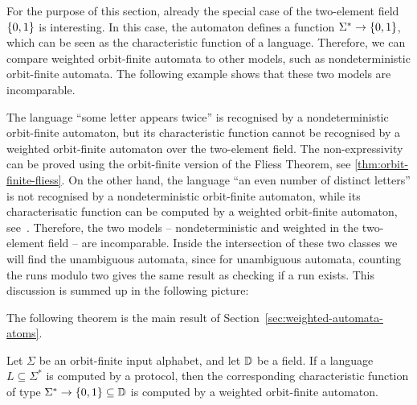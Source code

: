 For the purpose of this section, already the special case of the two-element field $\{0,1\}$ is interesting. In this case, the automaton defines a function $\Sigma^* \to \{0,1\}$, which can be seen as the characteristic function of a language. Therefore, we can compare weighted orbit-finite automata to other models, such as nondeterministic orbit-finite automata. The following example shows that these two  models are incomparable. 

\begin{myexample}\label{ex:weighted-vs-nondet-orbit-finite}
    The language ``some letter appears twice'' is recognised by a nondeterministic orbit-finite automaton, but its characteristic function cannot be  recognised by a weighted orbit-finite automaton over the two-element field. The non-expressivity can be proved using the orbit-finite version of the Fliess Theorem, see \cref{thm:orbit-finite-fliess}. On the other hand, the  language ``an even number of distinct letters'' is not recognised by a nondeterministic orbit-finite automaton, while its characterisatic function can  be computed by a weighted orbit-finite automaton, see~\cite[Example 3.2]{orbitFiniteVectorTheoretics}. Therefore, the two models -- nondeterministic and weighted in the two-element field -- are incomparable. Inside the intersection of these two classes we will find the unambiguous automata, since for unambiguous automata, counting the runs modulo two gives the same result as checking if a run exists. This discussion is summed up in the following picture:
\end{myexample}

The following theorem is the main result of Section~\ref{sec:weighted-automata-atoms}.
\begin{theorem}\label{thm:orbit-finite-protocol-to-weighted}
    Let $\Sigma$ be an orbit-finite input alphabet, and let $\mathbb D$ be a field.
    If a language $L \subseteq \Sigma^*$ is computed by a protocol, then the corresponding characteristic function of type $\Sigma^* \to \{0,1\} \subseteq \mathbb D$  is computed by a weighted orbit-finite automaton.
\end{theorem}


